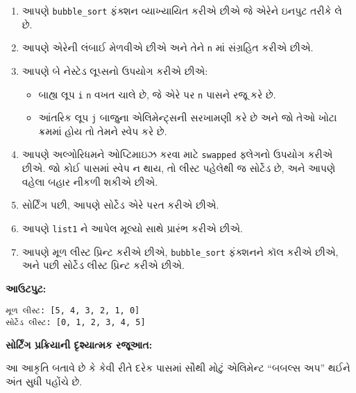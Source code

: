 \begin{enumerate}
\def\labelenumi{\arabic{enumi}.}
\tightlist
\item
  આપણે \texttt{bubble\_sort} ફંક્શન વ્યાખ્યાયિત કરીએ છીએ જે એરેને ઇનપુટ તરીકે લે છે.
\item
  આપણે એરેની લંબાઈ મેળવીએ છીએ અને તેને \texttt{n} માં સંગ્રહિત કરીએ છીએ.
\item
  આપણે બે નેસ્ટેડ લૂપ્સનો ઉપયોગ કરીએ છીએ:

  \begin{itemize}
  \tightlist
  \item
    બાહ્ય લૂપ \texttt{i} \texttt{n} વખત ચાલે છે, જે એરે પર \texttt{n} પાસને રજૂ
    કરે છે.
  \item
    આંતરિક લૂપ \texttt{j} બાજુના એલિમેન્ટ્સની સરખામણી કરે છે અને જો તેઓ ખોટા ક્રમમાં
    હોય તો તેમને સ્વેપ કરે છે.
  \end{itemize}
\item
  આપણે અલ્ગોરિધમને ઓપ્ટિમાઇઝ કરવા માટે \texttt{swapped} ફ્લેગનો ઉપયોગ કરીએ છીએ.
  જો કોઈ પાસમાં સ્વેપ ન થાય, તો લીસ્ટ પહેલેથી જ સોર્ટેડ છે, અને આપણે વહેલા બહાર
  નીકળી શકીએ છીએ.
\item
  સોર્ટિંગ પછી, આપણે સોર્ટેડ એરે પરત કરીએ છીએ.
\item
  આપણે \texttt{list1} ને આપેલ મૂલ્યો સાથે પ્રારંભ કરીએ છીએ.
\item
  આપણે મૂળ લીસ્ટ પ્રિન્ટ કરીએ છીએ, \texttt{bubble\_sort} ફંક્શનને કૉલ કરીએ છીએ,
  અને પછી સોર્ટેડ લીસ્ટ પ્રિન્ટ કરીએ છીએ.
\end{enumerate}

\textbf{આઉટપુટ:}

\begin{verbatim}
મૂળ લીસ્ટ: [5, 4, 3, 2, 1, 0]
સોર્ટેડ લીસ્ટ: [0, 1, 2, 3, 4, 5]
\end{verbatim}

\textbf{સોર્ટિંગ પ્રક્રિયાની દૃશ્યાત્મક રજૂઆત:}

\begin{Shaded}
\begin{Highlighting}[]
\end{Highlighting}
\end{Shaded}

આ આકૃતિ બતાવે છે કે કેવી રીતે દરેક પાસમાં સૌથી મોટું એલિમેન્ટ ``બબલ્સ અપ'' થઈને અંત સુધી
પહોંચે છે.

